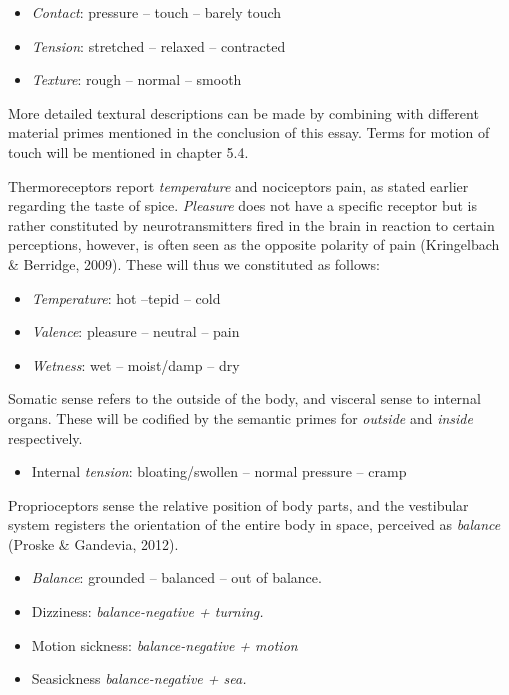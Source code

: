 \begin{itemize}
\item   \textit{Contact}: pressure – touch – barely touch  

\item   \textit{Tension}: stretched – relaxed – contracted  

\item   \textit{Texture}: rough – normal – smooth 
\end{itemize}

More detailed textural descriptions can be made by combining with different material primes mentioned in the conclusion of this essay. Terms for motion of touch will be mentioned in chapter 5.4.  

Thermoreceptors report \textit{temperature} and nociceptors pain, as stated earlier regarding the taste of spice. \textit{Pleasure} does not have a specific receptor but is rather constituted by neurotransmitters fired in the brain in reaction to certain perceptions, however, is often seen as the opposite polarity of pain (Kringelbach \& Berridge, 2009). These will thus we constituted as follows:  


\begin{itemize}
\item   \textit{Temperature}: hot –tepid – cold  

\item   \textit{Valence}: pleasure – neutral – pain  

\item   \textit{Wetness}: wet – moist/damp – dry 
\end{itemize}

Somatic sense refers to the outside of the body, and visceral sense to internal organs. These will be codified by the semantic primes for \textit{outside} and \textit{inside} respectively.   

\begin{itemize}
	\item Internal \textit{tension}: bloating/swollen – normal pressure – cramp  
\end{itemize}

Proprioceptors sense the relative position of body parts, and the vestibular system registers the orientation of the entire body in space, perceived as \textit{balance} (Proske \& Gandevia, 2012).  

\begin{itemize}
	\item \textit{Balance}: grounded – balanced – out of balance.  

	\item Dizziness: \textit{balance-negative + turning.} 

	\item Motion sickness:  \textit{ balance-negative + motion } 

	\item Seasickness \textit{balance-negative + sea.} 
\end{itemize}


